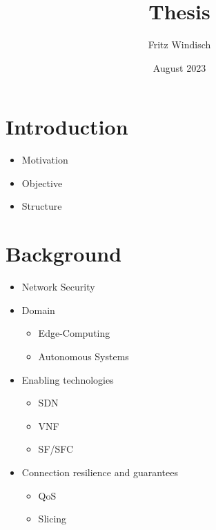 \documentclass{article}
\title{Thesis}
\author{Fritz Windisch}
\date{August 2023}
\begin{document}
\maketitle

\section{Introduction}
\begin{itemize}
    \item Motivation
    \item Objective
    \item Structure
\end{itemize}

\section{Background}
\begin{itemize}
    \item Network Security
    \item Domain
    \begin{itemize}
        \item Edge-Computing
        \item Autonomous Systems
    \end{itemize}
    \item Enabling technologies
    \begin{itemize}
        \item SDN
        \item VNF
        \item SF/SFC
    \end{itemize}
    \item Connection resilience and guarantees
    \begin{itemize}
        \item QoS
        \item Slicing
    \end{itemize}
\end{itemize}
\end{document}
